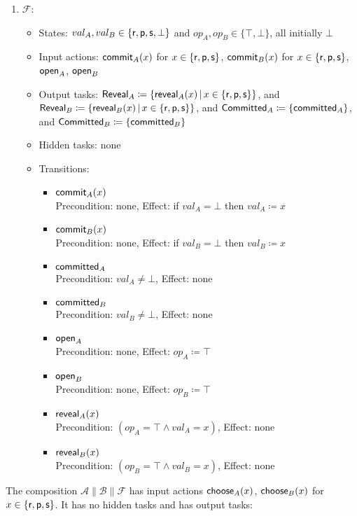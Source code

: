 \documentclass[10pt]{article}
\begin{document}
\begin{example}[$\RPSIdeal$]
\begin{enumerate}
\item $\mathcal{F}$:
\begin{itemize}
\item States: $val_A, val_B \in \{\mathsf{r},\mathsf{p},\mathsf{s},\bot\}$ and $op_A, op_B \in \{\top,\bot\}$, all initially $\bot$
\item Input actions: $\mathsf{commit}_A(x)$ for $x \in \{\mathsf{r},\mathsf{p},\mathsf{s}\}$, $\mathsf{commit}_B(x)$ for $x \in \{\mathsf{r},\mathsf{p},\mathsf{s}\}$, $\mathsf{open}_A$, $\mathsf{open}_B$
\item Output tasks: $\mathsf{Reveal}_A \coloneqq \{\mathsf{reveal}_A(x) \, | \, x \in \{\mathsf{r},\mathsf{p},\mathsf{s}\}\}$, and $\mathsf{Reveal}_B \coloneqq \{\mathsf{reveal}_B(x) \, | \, x \in \{\mathsf{r},\mathsf{p},\mathsf{s}\}\}$, and $\mathsf{Committed}_A \coloneqq \{\mathsf{committed}_A\}$, and $\mathsf{Committed}_B \coloneqq \{\mathsf{committed}_B\}$ 
\item Hidden tasks: none
\item Transitions:
\begin{itemize}
\item $\mathsf{commit}_A(x)$ \\
Precondition: none, Effect: if $val_A = \bot$ then $val_A \coloneqq x$
\item $\mathsf{commit}_B(x)$ \\
Precondition: none, Effect: if $val_B = \bot$ then $val_B \coloneqq x$
\item $\mathsf{committed}_A$ \\
Precondition: $val_A \neq \bot$, Effect: none
\item $\mathsf{committed}_B$ \\
Precondition: $val_B \neq \bot$, Effect: none
\item $\mathsf{open}_A$\\
Precondition: none, Effect: $op_A \coloneqq \top$
\item $\mathsf{open}_B$\\
Precondition: none, Effect: $op_B \coloneqq \top$
\item $\mathsf{reveal}_A(x)$\\
Precondition: $(op_A = \top \wedge val_A = x)$, Effect: none
\item $\mathsf{reveal}_B(x)$\\
Precondition: $(op_B = \top \wedge val_B = x)$, Effect: none
\end{itemize}
\end{itemize}
\end{enumerate}
The composition $\mathcal{A} \parallel \mathcal{B} \parallel \mathcal{F}$ has input actions $\mathsf{choose}_A(x)$, $\mathsf{choose}_B(x)$ for $x \in \{\mathsf{r},\mathsf{p},\mathsf{s}\}$. It has no hidden tasks and has output tasks: 

\end{example}
\end{document}
